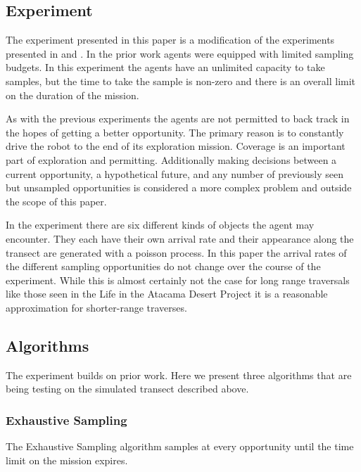 \subsection{Experiment}

The experiment presented in this paper is a modification of the experiments
presented in \cite{furlong2014sequential} and \cite{furlong2014budgeting}.  In
the prior work agents were equipped with limited sampling budgets.  In this
experiment the agents have an unlimited capacity to take samples, but the time
to take the sample is non-zero and there is an overall limit on the duration of
the mission.

As with the previous experiments the agents are not permitted to back track in
the hopes of getting a better opportunity.  The primary reason is to constantly
drive the robot to the end of its exploration mission.  Coverage is an
important part of exploration and permitting.  Additionally making decisions
between a current opportunity, a hypothetical future, and any number of
previously seen but unsampled opportunities is considered a more complex
problem and outside the scope of this paper.

In the experiment there are six different kinds of objects the agent may
encounter.  They each have their own arrival rate and their appearance along
the transect are generated with a poisson process.  In this paper the arrival
rates of the different sampling opportunities do not change over the course of
the experiment.  While this is almost certainly not the case for long range
traversals like those seen in the Life in the Atacama Desert Project it is a
reasonable approximation for shorter-range traverses.

\subsection{Algorithms}


	The experiment builds on prior work.  Here we present three algorithms that are being testing on the simulated transect described above.

\subsubsection{Exhaustive Sampling}

The Exhaustive Sampling algorithm samples at every opportunity until the time limit on the mission expires.


